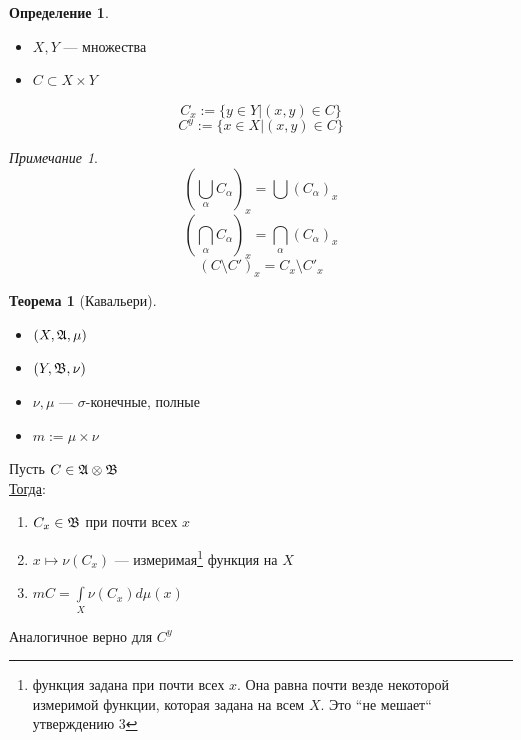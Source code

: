 \documentclass[oneside]{book}
\theoremstyle{plain}
\theoremstyle{remark}
\newtheorem*{remark}{Примечание}
\theoremstyle{definition}
\newtheorem{theorem}{Теорема}[section]
\newtheorem*{definition}{Определение}
\begin{document}
\begin{definition}
\-
\begin{itemize}
\item \(X, Y\) --- множества
\item \(C \subset X \times Y\)
\end{itemize}
\[ C_x := \{y \in Y| (x, y) \in C\} \]
\[ C^y := \{x \in X| (x, y) \in C \} \]
\end{definition}
\begin{remark}
\[ \left(\bigcup\limits_\alpha C_\alpha\right)_x = \bigcup\left(C_\alpha\right)_x \]
\[ \left(\bigcap\limits_\alpha C_\alpha\right)_x = \bigcap\limits_\alpha\left(C_\alpha\right)_x \]
\[ \left(C \setminus C'\right)_x = C_x \setminus C'_x \]
\end{remark}
\begin{theorem}[Кавальери]
\-
\begin{itemize}
\item \((X, \mathfrak{A}, \mu)\)
\item \((Y, \mathfrak{B}, \nu)\)
\item \(\nu, \mu\) --- \(\sigma\)-конечные, полные
\item \(m := \mu \times \nu\)
\end{itemize}
Пусть \(C \in \mathfrak{A} \otimes \mathfrak{B}\) \\
\uline{Тогда}:
\begin{enumerate}
\item \(C_x \in \mathfrak{B}\) при почти всех \(x\)
\item \(x \mapsto \nu(C_x)\) --- измеримая\footnote{функция задана при почти всех \(x\). Она равна почти везде некоторой измеримой функции, которая задана на всем \(X\). Это ``не мешает`` утверждению 3} функция на \(X\)
\item \(mC = \int\limits_X \nu(C_x)d\mu(x)\)
\end{enumerate}
Аналогичное верно для \(C^y\)
\end{theorem}
\end{document}
